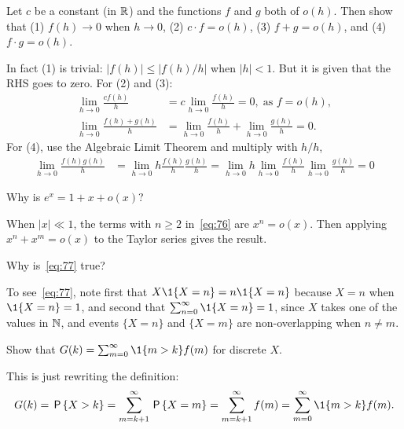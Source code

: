 \documentclass[queueing-book]{subfiles}
\begin{document}
\begin{exercise}\label{ex:l-104}
 Let $c$ be a constant (in $\mathbb{R}$) and the functions $f$ and $g$ both of $o(h)$. Then show that (1) $f(h) \to 0$ when $h\to 0$, (2) $c\cdot f = o(h)$, (3) $f+g=o(h)$, and (4) $f\cdot g=o(h)$.
\begin{solution}
 In fact (1) is trivial: $|f(h)| \leq |f(h)/h|$ when $|h| < 1$.
 But it is given that the RHS goes to zero.
 For (2) and (3):
\begin{align*}
\lim_{h\to 0} \frac{c f(h)}{h} &= c \lim_{h\to 0} \frac{f(h)}{h} = 0, \; \text{as } f = o(h), \\
\lim_{h\to 0} \frac{f(h) + g(h)} h &= \lim_{h\to 0} \frac{f(h)} h + \lim_{h\to 0} \frac{g(h)} h = 0.
\end{align*}
For (4), use the Algebraic Limit Theorem and multiply with $h/h$,
\begin{align*}
\lim_{h\to 0} \frac{f(h)g(h)}{h} &= \lim_{h\to 0} h \frac{f(h)}{h} \frac{g(h)}{h}
= \lim_{h\to 0} h \lim_{h\to 0} \frac{f(h)}{h} \lim_{h\to 0} \frac{g(h)}{h} = 0
\end{align*}
\end{solution}
\end{exercise}


\begin{exercise}\label{ex:87}
 Why is $e^{x} = 1 +x + o(x)$?
\begin{solution}
 When $|x|\ll 1$, the terms with $n\geq 2$ in~\cref{eq:76} are $x^n = o(x)$. Then applying $x^n + x^m = o(x)$ to the Taylor series gives the result.
\end{solution}
\end{exercise}

\begin{exercise}
 Why is~\cref{eq:77} true?
\begin{solution}
To see~\cref{eq:77}, note first that $X\1{X=n} = n\1{X=n}$ because $X=n$ when $\1{X=n} =1$, and second that $\sum_{n=0}^\infty \1{X=n} =1$, since $X$ takes one of the values in $\mathbb{N}$, and events $\{X=n\}$ and $\{X=m\}$ are non-overlapping when $n\neq m$.
\end{solution}
\end{exercise}

\begin{exercise}\label{ex:l-105}
Show that $G(k) = \sum_{m=0}^\infty \1{m>k} f(m)$ for discrete $X$.
\begin{solution}
 This is just rewriting the definition:
\begin{equation*}
G(k) = \P{X>k} = \sum_{m=k+1}^\infty \P{X=m} = \sum_{m=k+1}^\infty f(m)=\sum_{m=0}^\infty \1{m>k}f(m).
\end{equation*}
\end{solution}
\end{exercise}
\end{document}
